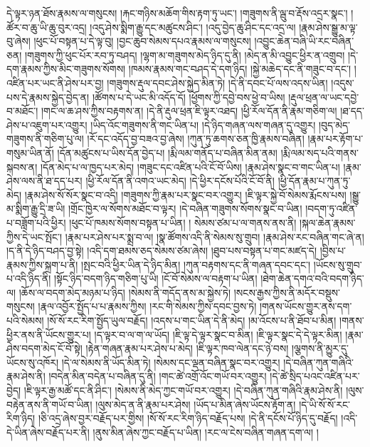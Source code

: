 དེ་ལྟར་ཉན་ཐོས་རྣམས་ལ་གསུངས། །རྐང་གཉིས་མཆོག་གིས་རྟག་ཏུ་ཡང་། །གཟུགས་ནི་ལྦུ་བ་རྡོས་འདྲར་སྣང་། །ཚོར་བ་ཆུ་ཡི་ཆུ་བུར་འདྲ། །འདུ་ཤེས་སྨིག་རྒྱུ་དང་མཚུངས་ཤིང་། །འདུ་བྱེད་ཆུ་ཤིང་དང་འདྲ་ལ། །རྣམ་ཤེས་སྒྱུ་མ་ལྟ་བུ་ཞེས། །ཕུང་པོ་བསྟན་པ་དེ་ལྟ་བུ། །བྱང་ཆུབ་སེམས་དཔའ་རྣམས་ལ་གསུངས། །འབྱུང་ཆེན་བཞི་ཡི་རང་བཞིན་ཅན། །གཟུགས་ཀྱི་ཕུང་པོར་རབ་ཏུ་བཤད། །ལྷག་མ་གཟུགས་མེད་ཉིད་དུ་ནི། །མེད་ན་མི་འབྱུང་ཕྱིར་ན་འགྲུབ། །དེ་དག་རྣམས་ཀྱིས་མིང་གཟུགས་སོགས། །ཁམས་རྣམས་གང་བཤད་དེ་དག་ཉིད། །སྐྱེ་མཆེད་དང་ནི་གཟུང་བ་དང་། །འཛིན་པར་ཡང་ནི་ཤེས་པར་བྱ། །གཟུགས་རྡུལ་དབང་ཤེས་སྐྱེད་མིན་ཏེ། །དེ་ནི་དབང་པོ་ལས་འདས་ཡིན། །འདུས་པས་དེ་རྣམས་སྐྱེད་བྱེད་ན། །ཚོགས་པ་དེ་ཡང་མི་འདོད་དོ། །ཕྱོགས་ཀྱི་དབྱེ་བས་ཕྱེ་བ་ཡིས། །རྡུལ་ཕྲན་ལ་ཡང་དབྱེ་བ་མཐོང་། །གང་ལ་ཆ་ཤས་ཀྱིས་བརྟགས་ན། །དེ་ནི་རྡུལ་ཕྲན་ཇི་ལྟར་འཐད། །ཕྱི་རོལ་དོན་ནི་རྣམ་གཅིག་ལ། །ཐ་དད་ཤེས་པ་འཇུག་པར་འགྱུར། །ཡིད་འོང་གཟུགས་ནི་གང་ཡིན་པ། །དེ་ཉིད་གཞན་ལས་གཞན་དུ་འགྱུར། །བུད་མེད་གཟུགས་ནི་གཅིག་པུ་ལ། །རོ་དང་འདོད་བྱ་བཟའ་བྱ་ཞེས། །ཀུན་ཏུ་ཆགས་ཅན་ཁྱི་རྣམས་བཞིན། །རྣམ་པར་རྟོག་པ་གསུམ་ཡིན་ནོ། །དོན་མཚུངས་པ་ཡིས་དོན་བྱེད་པ། །རྨི་ལམ་གནོད་པ་བཞིན་མིན་ནམ། །རྨི་ལམ་སད་པའི་གནས་སྐབས་ན། །དོན་མེད་པ་ལ་ཁྱད་པར་མེད། །གཟུང་དང་འཛིན་པའི་ངོ་བོ་ཡིས། །རྣམ་ཤེས་སྣང་བ་གང་ཡིན་པ། །རྣམ་ཤེས་ལས་ནི་ཐ་དད་པར། །ཕྱི་རོལ་དོན་ནི་འགའ་ཡང་མེད། །དེ་ཕྱིར་དངོས་པོའི་ངོ་བོ་ནི། །ཕྱི་དོན་རྣམ་པ་ཀུན་ཏུ་མེད། །རྣམ་ཤེས་སོ་སོར་སྣང་བ་འདི། །གཟུགས་ཀྱི་རྣམ་པར་སྣང་བར་འགྱུར། །ཇི་ལྟར་སྐྱེ་བོ་སེམས་རྨོངས་པས། །སྒྱུ་མ་སྨིག་རྒྱུ་དྲི་ཟ་ཡི། །གྲོང་ཁྱེར་ལ་སོགས་མཐོང་བ་ལྟར། །དེ་བཞིན་གཟུགས་སོགས་སྣང་བ་ཡིན། །བདག་ཏུ་འཛིན་པ་བཟློག་པའི་ཕྱིར། །ཕུང་པོ་ཁམས་སོགས་བསྟན་པ་ཡིན། །
སེམས་ཙམ་པ་ལ་གནས་ནས་ནི། །སྐལ་ཆེན་རྣམས་ཀྱིས་དེ་ཡང་སྤོང་། །རྣམ་པར་ཤེས་པར་སྨྲ་བ་ལ། །སྣ་ཚོགས་འདི་ནི་སེམས་སུ་གྲུབ། །རྣམ་ཤེས་རང་བཞིན་གང་ཞེ་ན། །ད་ནི་དེ་ཉིད་བཤད་བྱ་སྟེ། །འདི་དག་ཐམས་ཅད་སེམས་ཙམ་ཞེས། །ཐུབ་པས་བསྟན་པ་གང་མཛད་དེ། །བྱིས་པ་རྣམས་ཀྱིས་སྐྲག་པ་ནི། །སྤང་བའི་ཕྱིར་ཡིན་དེ་ཉིད་མིན། །ཀུན་བརྟགས་དང་ནི་གཞན་དབང་དང་། །ཡོངས་སུ་གྲུབ་པ་འདི་ཉིད་ནི། །སྟོང་ཉིད་བདག་ཉིད་གཅིག་པུ་ཡི། །ངོ་བོ་སེམས་ལ་བརྟག་པ་ཡིན། །ཐེག་ཆེན་དགའ་བའི་བདག་ཉིད་ལ། །ཆོས་ལ་བདག་མེད་མཉམ་པ་ཉིད། །སེམས་ནི་གདོད་ནས་མ་སྐྱེས་ཏེ། །སངས་རྒྱས་ཀྱིས་ནི་མདོར་བསྡུས་གསུངས། །རྣལ་འབྱོར་སྤྱོད་པ་པ་རྣམས་ཀྱིས། །རང་གི་སེམས་ཀྱིས་དབང་བྱས་ཏེ། །གནས་ཡོངས་གྱུར་ནས་དག་པའི་སེམས། །སོ་སོ་རང་རིག་སྤྱོད་ཡུལ་བརྗོད། །འདས་པ་གང་ཡིན་དེ་ནི་མེད། །མ་འོངས་པ་ནི་ཐོབ་པ་མིན། །གནས་ཕྱིར་ནས་ནི་ཡོངས་གྱུར་པ། །ད་ལྟར་བ་ལ་ག་ལ་ཡོད། །ཇི་ལྟ་དེ་ལྟར་སྣང་བ་མིན། །ཇི་ལྟར་སྣང་དེ་དེ་ལྟར་མིན། །རྣམ་ཤེས་བདག་མེད་ངོ་བོ་སྟེ། །རྟེན་གཞན་རྣམ་པར་ཤེས་པ་མེད། །ཇི་ལྟར་ཁབ་ལེན་དང་ཉེ་བས། །ལྕགས་ནི་མྱུར་དུ་ཡོངས་སུ་འཁོར། །དེ་ལ་སེམས་ནི་ཡོད་མིན་ཏེ། །སེམས་དང་ལྡན་བཞིན་སྣང་བར་འགྱུར། །དེ་བཞིན་ཀུན་གཞིའི་རྣམ་ཤེས་ནི། །བདེན་མིན་བདེན་པ་བཞིན་དུ་ནི། །གང་ཚེ་འགྲོ་འོང་གཡོ་བར་འགྱུར། །དེ་ཚེ་སྲིད་པའང་འཛིན་པར་བྱེད། །ཇི་ལྟར་རྒྱ་མཚོ་དང་ནི་ཤིང་། །སེམས་ནི་མེད་ཀྱང་གཡོ་བར་འགྱུར། །དེ་བཞིན་ཀུན་གཞིའི་རྣམ་ཤེས་ནི། །ལུས་བརྟེན་ནས་ནི་གཡོ་བ་ཡིན། །ལུས་མེད་ན་ནི་རྣམ་པར་ཤེས། །ཡོད་པ་མིན་ཞེས་ཡོངས་རྟོག་ན། །དེ་ཡི་སོ་སོ་རང་རིག་ཉིད། །ཅི་འདྲ་ཞེས་བྱར་བརྗོད་པར་གྱིས། །སོ་སོ་རང་རིག་ཉིད་བརྗོད་པས། །དེ་ནི་དངོས་པོ་ཉིད་དུ་བརྗོད། །འདི་དེ་ཡིན་ཞེས་བརྗོད་པར་ནི། །ནུས་མིན་ཞེས་ཀྱང་བརྗོད་པ་ཡིན། །རང་ལ་ངེས་བཞིན་གཞན་དག་ལ། །
